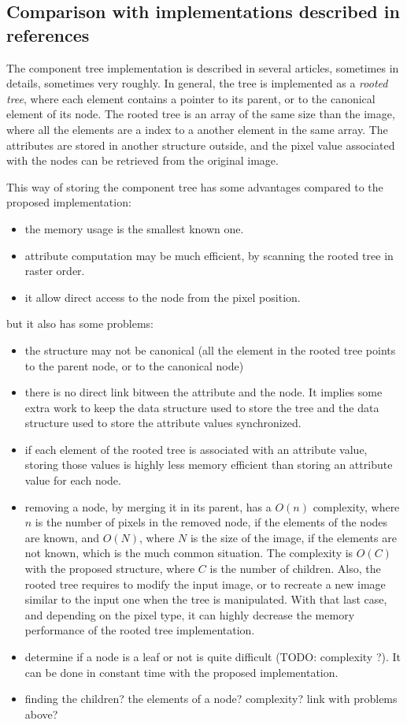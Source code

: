 \documentclass{InsightArticle}
\begin{document}
  \subsection{Comparison with implementations described in references}

The component tree implementation is described in several articles, sometimes in details, sometimes very roughly.
In general, the tree is implemented as a {\em rooted tree}, where each element contains a pointer to its parent, or to the canonical element of its node. The rooted tree is an array of the same size than the image, where all the elements are a index to a another element in the same array. The attributes are stored in another structure outside, and the pixel value associated with the nodes can be retrieved from the original image.

This way of storing the component tree has some advantages compared to the proposed implementation:
\begin{itemize}
  \item the memory usage is the smallest known one.
  \item attribute computation may be much efficient, by scanning the rooted tree in raster order.
  \item it allow direct access to the node from the pixel position.
\end{itemize}
but it also has some problems:
\begin{itemize}
  \item the structure may not be canonical (all the element in the rooted tree points to the parent node, or to the canonical node)
  \item there is no direct link bitween the attribute and the node. It implies some extra work to keep the data structure used to store the tree and the data structure used to store the attribute values synchronized.
  \item if each element of the rooted tree is associated with an attribute value, storing those values is highly less memory efficient than storing an attribute value for each node.
  \item removing a node, by merging it in its parent, has a $O(n)$ complexity, where $n$ is the number of pixels in the removed node, if the elements of the nodes are known, and $O(N)$, where $N$ is the size of the image, if the elements are not known, which is the much common situation. The complexity is $O(C)$ with the proposed structure, where $C$ is the number of children. Also, the rooted tree requires to modify the input image, or to recreate a new image similar to the input one when the tree is manipulated. With that last case, and depending on the pixel type, it can highly decrease the memory performance of the rooted tree implementation.
  \item determine if a node is a leaf or not is quite difficult (TODO: complexity ?). It can be done in constant time with the proposed implementation.
  \item finding the children? the elements of a node? complexity? link with problems above?
\end{itemize}
\end{document}
